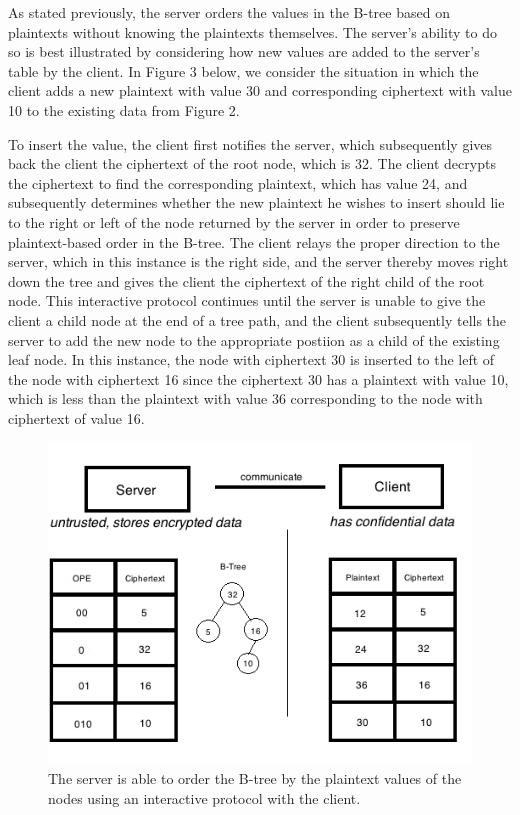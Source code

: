 \documentclass[12pt]{article}
\begin{document}
As stated previously, the server orders the values in the B-tree based on plaintexts without knowing the plaintexts themselves. The server's ability to do so is best illustrated by considering how new values are added to the server's table by the client. In Figure 3 below, we consider the situation in which the client adds a new plaintext with value 30 and corresponding ciphertext with value 10 to the existing data from Figure 2.

To insert the value, the client first notifies the server, which subsequently gives back the client the ciphertext of the root node, which is 32. The client decrypts the ciphertext to find the corresponding plaintext, which has value 24, and subsequently determines whether the new plaintext he wishes to insert should lie to the right or left of the node returned by the server in order to preserve plaintext-based order in the B-tree. The client relays the proper direction to the server, which in this instance is the right side, and the server thereby moves right down the tree and gives the client the ciphertext of the right child of the root node. This interactive protocol continues until the server is unable to give the client a child node at the end of a tree path, and the client subsequently tells the server to add the new node to the appropriate postiion as a child of the existing leaf node. In this instance, the node with ciphertext 30 is inserted to the left of the node with ciphertext 16 since the ciphertext 30 has a plaintext with value 10, which is less than the plaintext with value 36 corresponding to the node with ciphertext of value 16. 

\begin{figure}[htb]
\begin{center}
\includegraphics[scale=0.6]{857pic5.png}
\caption{The server is able to order the B-tree by the plaintext values of the nodes using an interactive protocol with the client.}
\end{center}
\end{figure}
\end{document}
